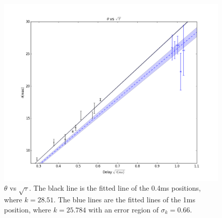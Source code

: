 \documentclass[useAMS,usenatbib]{mn2e}
\begin{document}

\begin{figure}
\centering
\includegraphics[width=1.0\textwidth, angle=0]{Theta_tau.png}
\caption{${\theta}$ vs ${\sqrt{\tau}}$. The black line is the fitted line of the 0.4ms positions, where $k=28.51$. The blue lines are the fitted lines of the 1ms position, where $k=25.784$ with an error region of $\sigma_k=0.66$.
}
\end{figure}
\end{document}
